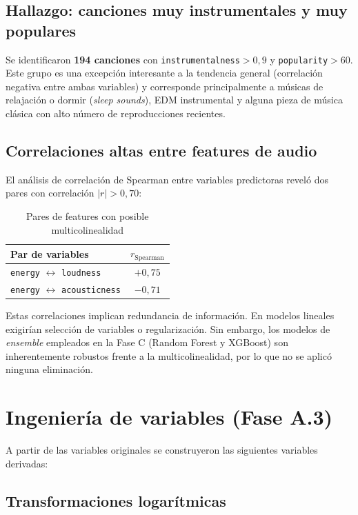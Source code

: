 \documentclass[12pt, a4paper, twoside]{book}
\theoremstyle{definition}
\begin{document}
\subsection{Hallazgo: canciones muy instrumentales y muy populares}

Se identificaron \textbf{194 canciones} con \texttt{instrumentalness}$> 0{,}9$ y
\texttt{popularity}$> 60$. Este grupo es una excepción interesante a la tendencia
general (correlación negativa entre ambas variables) y corresponde principalmente
a músicas de relajación o dormir (\textit{sleep sounds}), EDM instrumental y alguna
pieza de música clásica con alto número de reproducciones recientes.

\subsection{Correlaciones altas entre features de audio}

El análisis de correlación de Spearman entre variables predictoras reveló dos pares
con correlación $|r| > 0{,}70$:

\begin{table}[H]
\centering
\caption{Pares de features con posible multicolinealidad}
\label{tab:multicol}
\begin{tabular}{lc}
\toprule
\textbf{Par de variables} & $r_{\text{Spearman}}$ \\
\midrule
\texttt{energy} $\leftrightarrow$ \texttt{loudness}     & $+0{,}75$ \\
\texttt{energy} $\leftrightarrow$ \texttt{acousticness} & $-0{,}71$ \\
\bottomrule
\end{tabular}
\end{table}

Estas correlaciones implican redundancia de información. En modelos lineales
exigirían selección de variables o regularización. Sin embargo, los modelos de
\textit{ensemble} empleados en la Fase C (Random Forest y XGBoost) son
inherentemente robustos frente a la multicolinealidad, por lo que no se aplicó
ninguna eliminación.

\section{Ingeniería de variables (Fase A.3)}

A partir de las variables originales se construyeron las siguientes variables
derivadas:

\subsection{Transformaciones logarítmicas}
\end{document}
